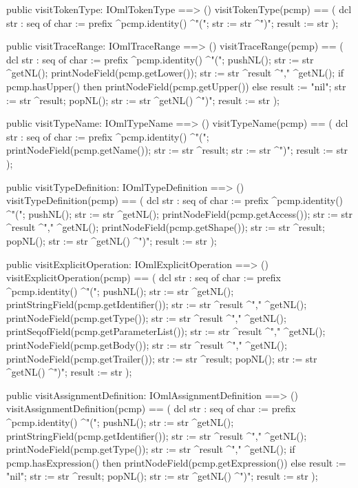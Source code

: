 \begin{vdm_al}
  public visitTokenType: IOmlTokenType ==> ()
  visitTokenType(pcmp) ==
    ( dcl str : seq of char := prefix ^pcmp.identity() ^"(";
      str := str ^")";
      result := str );

  public visitTraceRange: IOmlTraceRange ==> ()
  visitTraceRange(pcmp) ==
    ( dcl str : seq of char := prefix ^pcmp.identity() ^"(";
      pushNL();
      str := str ^getNL();
      printNodeField(pcmp.getLower());
      str := str ^result ^"," ^getNL();
      if pcmp.hasUpper()
      then printNodeField(pcmp.getUpper())
      else result := "nil";
      str := str ^result;
      popNL();
      str := str ^getNL() ^")";
      result := str );

  public visitTypeName: IOmlTypeName ==> ()
  visitTypeName(pcmp) ==
    ( dcl str : seq of char := prefix ^pcmp.identity() ^"(";
      printNodeField(pcmp.getName());
      str := str ^result;
      str := str ^")";
      result := str );

  public visitTypeDefinition: IOmlTypeDefinition ==> ()
  visitTypeDefinition(pcmp) ==
    ( dcl str : seq of char := prefix ^pcmp.identity() ^"(";
      pushNL();
      str := str ^getNL();
      printNodeField(pcmp.getAccess());
      str := str ^result ^"," ^getNL();
      printNodeField(pcmp.getShape());
      str := str ^result;
      popNL();
      str := str ^getNL() ^")";
      result := str );

  public visitExplicitOperation: IOmlExplicitOperation ==> ()
  visitExplicitOperation(pcmp) ==
    ( dcl str : seq of char := prefix ^pcmp.identity() ^"(";
      pushNL();
      str := str ^getNL();
      printStringField(pcmp.getIdentifier());
      str := str ^result ^"," ^getNL();
      printNodeField(pcmp.getType());
      str := str ^result ^"," ^getNL();
      printSeqofField(pcmp.getParameterList());
      str := str ^result ^"," ^getNL();
      printNodeField(pcmp.getBody());
      str := str ^result ^"," ^getNL();
      printNodeField(pcmp.getTrailer());
      str := str ^result;
      popNL();
      str := str ^getNL() ^")";
      result := str );

  public visitAssignmentDefinition: IOmlAssignmentDefinition ==> ()
  visitAssignmentDefinition(pcmp) ==
    ( dcl str : seq of char := prefix ^pcmp.identity() ^"(";
      pushNL();
      str := str ^getNL();
      printStringField(pcmp.getIdentifier());
      str := str ^result ^"," ^getNL();
      printNodeField(pcmp.getType());
      str := str ^result ^"," ^getNL();
      if pcmp.hasExpression()
      then printNodeField(pcmp.getExpression())
      else result := "nil";
      str := str ^result;
      popNL();
      str := str ^getNL() ^")";
      result := str );


\end{vdm_al}
